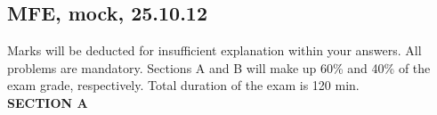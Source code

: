 \subsection{MFE, mock, 25.10.12}



Marks will be deducted for insufficient explanation within your answers. All problems are mandatory. Sections A and B will make up 60\% and 40\% of the exam grade, respectively. Total duration of the exam is 120 min. \\

\textbf{SECTION A}
\vspace{20pt}

